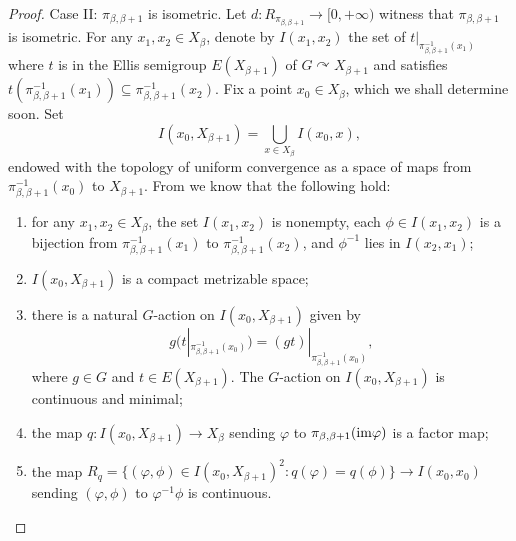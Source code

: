 \documentclass[11pt]{amsart}
\theoremstyle{definition}
\numberwithin{equation}{section}
\theoremstyle{definition}
\newcommand{\im}{{\rm im}}
\begin{document}
\begin{proof}
Case II: $\pi_{\beta, \beta+1}$ is isometric. Let $d: R_{\pi_{\beta, \beta+1}}\rightarrow [0, +\infty)$ witness that $\pi_{\beta, \beta+1}$ is isometric. 
For any $x_1, x_2\in X_\beta$, denote by $I(x_1, x_2)$ the set of $t|_{\pi_{\beta, \beta+1}^{-1}(x_1)}$ where $t$ is in the Ellis semigroup $E(X_{\beta+1})$ of $G\curvearrowright X_{\beta+1}$ and satisfies $t(\pi_{\beta, \beta+1}^{-1}(x_1))\subseteq \pi_{\beta, \beta+1}^{-1}(x_2)$. Fix a point $x_0\in X_\beta$, which we shall determine soon. Set 
$$I(x_0, X_{\beta+1})=\bigcup_{x\in X_\beta}I(x_0, x),$$
endowed with the topology of uniform convergence as a space of maps from $\pi_{\beta, \beta+1}^{-1}(x_0)$ to $X_{\beta+1}$. From \cite[Proposition 1.4]{Abels83} we know that the following hold:
\begin{enumerate}
\item for any $x_1, x_2\in X_\beta$, the set $I(x_1, x_2)$ is nonempty, each $\phi\in I(x_1, x_2)$ is a bijection from $\pi_{\beta, \beta+1}^{-1}(x_1)$ to $\pi_{\beta, \beta+1}^{-1}(x_2)$, and $\phi^{-1}$ lies in $I(x_2, x_1)$;
\item $I(x_0, X_{\beta+1})$ is a compact metrizable space;
\item there is a natural $G$-action on $I(x_0, X_{\beta+1})$ given by
$$g(t|_{\pi_{\beta, \beta+1}^{-1}(x_0)})=(gt)|_{\pi_{\beta, \beta+1}^{-1}(x_0)},$$
where $g\in G$ and $t\in E(X_{\beta+1})$. The $G$-action on $I(x_0, X_{\beta+1})$ is continuous and minimal;
\item the map $q: I(x_0, X_{\beta+1})\rightarrow X_\beta$ sending $\varphi$ to $\pi_{\beta, \beta+1}(\im \varphi)$ is a factor map;
\item the map $R_q=\{(\varphi, \phi)\in I(x_0, X_{\beta+1})^2: q(\varphi)=q(\phi)\}\rightarrow I(x_0, x_0)$ sending $(\varphi, \phi)$ to $\varphi^{-1}\phi$ is continuous. 
\end{enumerate}


\end{proof}
\end{document}
